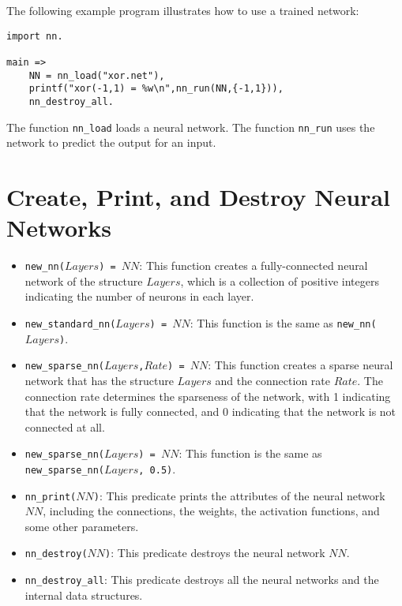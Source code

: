 The following example program illustrates how to use a trained network:
\begin{verbatim}
import nn.

main =>
    NN = nn_load("xor.net"),
    printf("xor(-1,1) = %w\n",nn_run(NN,{-1,1})),
    nn_destroy_all.
\end{verbatim}
The function \texttt{nn\_load} loads a neural network. The function \texttt{nn\_run} uses the network to predict the output for an input.

\section{Create, Print, and Destroy Neural Networks}
\begin{itemize}
\item \texttt{new\_nn($Layers$) = $NN$}: This function creates a fully-connected neural network of the structure $Layers$, which is a collection of positive integers indicating the number of neurons in each layer.

\item \texttt{new\_standard\_nn($Layers$) = $NN$}: This function is the same as \texttt{new\_nn($Layers$)}.

\item \texttt{new\_sparse\_nn($Layers$,$Rate$) = $NN$}: This function creates a sparse neural network that has the structure $Layers$ and the connection rate $Rate$. The connection rate determines the sparseness of the network, with 1 indicating that the network is fully connected, and 0 indicating that the network is not connected at all.

\item \texttt{new\_sparse\_nn($Layers$) = $NN$}: This function is the same as \texttt{new\_sparse\_nn($Layers$, 0.5)}.

\item \texttt{nn\_print($NN$)}: This predicate prints the attributes of the neural network $NN$, including the connections, the weights, the activation functions, and some other parameters.

\item \texttt{nn\_destroy($NN$)}: This predicate destroys the neural network $NN$.

\item \texttt{nn\_destroy\_all}: This predicate destroys all the neural networks and the internal data structures.
\end{itemize}


